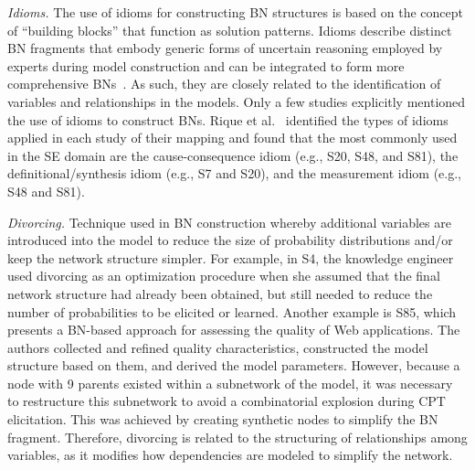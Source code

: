 \textit{Idioms.} The use of idioms for constructing BN structures is based on the concept of ``building blocks'' that function as solution patterns. Idioms describe distinct BN fragments that embody generic forms of uncertain reasoning employed by experts during model construction and can be integrated to form more comprehensive BNs~\cite{neil2000building}. As such, they are closely related to the identification of variables and relationships in the models. Only a few studies explicitly mentioned the use of idioms to construct BNs. Rique et al.~\cite{rique2025constructing} identified the types of idioms applied in each study of their mapping and found that the most commonly used in the SE domain are the cause-consequence idiom (e.g., S20, S48, and S81), the definitional/synthesis idiom (e.g., S7 and S20), and the measurement idiom (e.g., S48 and S81).

\textit{Divorcing.} Technique used in BN construction whereby additional variables are introduced into the model to reduce the size of probability distributions and/or keep the network structure simpler. For example, in S4, the knowledge engineer used divorcing as an optimization procedure when she assumed that the final network structure had already been obtained, but still needed to reduce the number of probabilities to be elicited or learned. Another example is S85, which presents a BN-based approach for assessing the quality of Web applications. The authors collected and refined quality characteristics, constructed the model structure based on them, and derived the model parameters. However, because a node with 9 parents existed within a subnetwork of the model, it was necessary to restructure this subnetwork to avoid a combinatorial explosion during CPT elicitation. This was achieved by creating synthetic nodes to simplify the BN fragment. Therefore, divorcing is related to the structuring of relationships among variables, as it modifies how dependencies are modeled to simplify the network.



